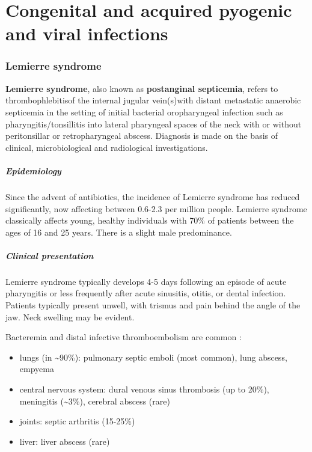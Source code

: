 \chapter{Congenital and acquired pyogenic and viral infections}

\subsection{Lemierre syndrome}

\textbf{Lemierre syndrome}, also known as \textbf{postanginal septicemia}, refers to thrombophlebitisof the internal jugular vein(s)with distant metastatic anaerobic septicemia in the setting of initial bacterial oropharyngeal infection such as pharyngitis/tonsillitis into lateral pharyngeal spaces of the neck with or without peritonsillar or retropharyngeal abscess. Diagnosis is made on the basis of clinical, microbiological and radiological investigations.

\paragraph{Epidemiology}

Since the advent of antibiotics, the incidence of Lemierre syndrome has reduced significantly, now affecting between 0.6-2.3 per million people. Lemierre syndrome classically affects young, healthy individuals with 70\% of patients between the ages of 16 and 25 years. There is a slight male predominance.

\paragraph{Clinical presentation}

Lemierre syndrome typically develops 4-5 days following an episode of acute pharyngitis or less frequently after acute sinusitis, otitis, or dental infection. Patients typically present unwell, with trismus and pain behind the angle of the jaw. Neck swelling may be evident.

Bacteremia and distal infective thromboembolism are common :

\begin{itemize}
	\item
	lungs (in \textasciitilde90\%): pulmonary septic emboli (most common), lung abscess, empyema
	\item
	central nervous system: dural venous sinus thrombosis (up to 20\%), meningitis (\textasciitilde3\%), cerebral abscess (rare) 
	\item
	joints: septic arthritis (15-25\%)
	\item
	liver: liver abscess (rare)
\end{itemize}


